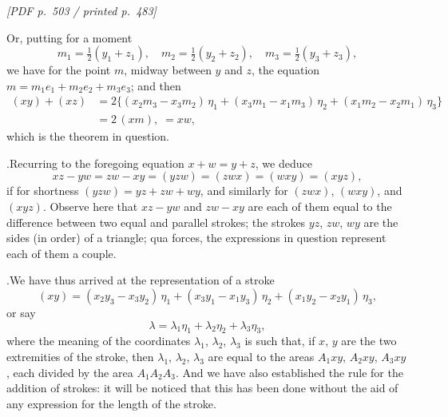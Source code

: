 \documentclass[11pt]{article}
\begin{document}
\vfill
\noindent\textit{[PDF p.~503 / printed p.~483]}
\newpage

\noindent Or, putting for a moment
\[
m_{1} = \tfrac{1}{2}(y_{1} + z_{1}),\quad m_{2} = \tfrac{1}{2}(y_{2} + z_{2}),\quad m_{3} = \tfrac{1}{2}(y_{3} + z_{3}),
\]
we have for the point $m$, midway between $y$ and $z$, the equation $m = m_{1}e_{1} + m_{2}e_{2} + m_{3}e_{3}$; and then
\begin{align*}
(xy) + (xz) &= 2\bigl\{(x_{2}m_{3} - x_{3}m_{2})\,\eta_{1} + (x_{3}m_{1} - x_{1}m_{3})\,\eta_{2} + (x_{1}m_{2} - x_{2}m_{1})\,\eta_{3}\bigr\} \\
&= 2\,(xm),\;= xw,
\end{align*}
which is the theorem in question.

\medskip

.\quad Recurring to the foregoing equation $x + w = y + z$, we deduce
\[
xz - yw = zw - xy = (yzw) = (zwx) = (wxy) = (xyz),
\]
if for shortness $(yzw) = yz + zw + wy$, and similarly for $(zwx)$, $(wxy)$, and $(xyz)$. Observe here that $xz - yw$ and $zw - xy$ are each of them equal to the difference between two equal and parallel strokes; the strokes $yz$, $zw$, $wy$ are the sides (in order) of a triangle; qua forces, the expressions in question represent each of them a couple.

\medskip

.\quad We have thus arrived at the representation of a stroke
\[
(xy) = (x_{2}y_{3} - x_{3}y_{2})\,\eta_{1} + (x_{3}y_{1} - x_{1}y_{3})\,\eta_{2} + (x_{1}y_{2} - x_{2}y_{1})\,\eta_{3},
\]
or say
\[
\lambda = \lambda_{1}\eta_{1} + \lambda_{2}\eta_{2} + \lambda_{3}\eta_{3},
\]
where the meaning of the coordinates $\lambda_{1}$, $\lambda_{2}$, $\lambda_{3}$ is such that, if $x$, $y$ are the two extremities of the stroke, then $\lambda_{1}$, $\lambda_{2}$, $\lambda_{3}$ are equal to the areas $A_{1}xy$, $A_{2}xy$, $A_{3}xy$, each divided by the area $A_{1}A_{2}A_{3}$. And we have also established the rule for the addition of strokes: it will be noticed that this has been done without the aid of any expression for the length of the stroke.

\medskip
\end{document}
